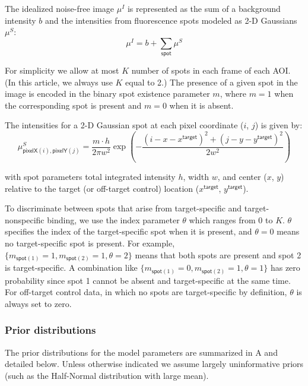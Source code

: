 The idealized noise-free image $\mu^I$ is represented  as the sum of a background intensity $b$ and the intensities from fluorescence spots modeled as  2-D Gaussians $\mu^S$:
%
\begin{equation}
    \mu^I = b + \sum_{\mathsf{spot}} \mu^S
\end{equation}

\noindent
For simplicity we allow at most $K$ number of spots in each frame of each AOI.  (In this article, we always use $K$ equal to 2.)  The presence of a given spot in the image is encoded in the binary spot existence parameter $m$, where $m = 1$ when the corresponding spot is present and $m = 0$ when it is absent.

The intensities for a 2-D Gaussian spot at each pixel coordinate ($i$, $j$) is given by:
%
\begin{equation}
    \mu^S_{\mathsf{pixelX}(i), \mathsf{pixelY}(j)} = \dfrac{m \cdot h}{2 \pi w^2} \exp{\left( -\dfrac{(i-x-x^\mathsf{target})^2 + (j-y-y^\mathsf{target})^2}{2 w^2} \right)}
\end{equation}

\noindent
with spot parameters total integrated intensity $h$, width $w$, and center ($x$, $y$) relative to the target (or off-target control) location ($x^\mathsf{target}$, $y^\mathsf{target}$). 
%

To discriminate between spots that arise from target-specific and target-nonspecific binding, we use the index parameter $\theta$ which ranges from $0$ to $K$. $\theta$ specifies the index of the target-specific spot when it is present, and $\theta = 0$ means no target-specific spot is present. For example, $\{ m_{\mathsf{spot}(1)}=1, m_{\mathsf{spot}(2)}=1, \theta=2 \}$ means that both spots are present and spot 2 is target-specific. A combination like $\{ m_{\mathsf{spot}(1)}=0, m_{\mathsf{spot}(2)}=1, \theta=1 \}$ has zero probability since spot 1 cannot be absent and target-specific at the same time. For off-target control data, in which no spots are target-specific by definition, $\theta$ is always set to zero.
%

\subsubsection{Prior distributions}

The prior distributions for the model parameters are summarized in A and detailed below. Unless otherwise indicated we assume largely uninformative priors (such as the Half-Normal distribution with large mean). 

